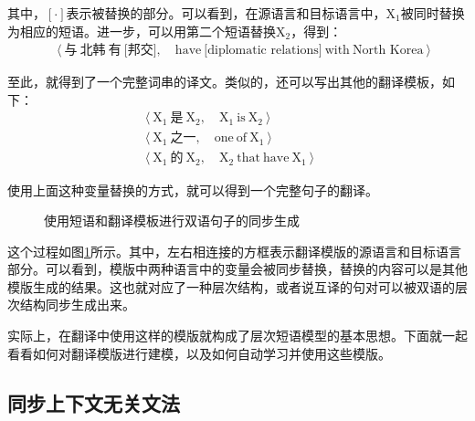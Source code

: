 \noindent 其中，$[\cdot]$表示被替换的部分。可以看到，在源语言和目标语言中，$\textrm{X}_1$被同时替换为相应的短语。进一步，可以用第二个短语替换$\textrm{X}_2$，得到：
\begin{eqnarray}
\quad\langle \ \text{与}\ \text{北韩}\ \text{有}\ \text{[邦交]},\quad \textrm{have}\ \textrm{[diplomatic relations]}\ \textrm{with}\ \textrm{North Korea} \ \rangle \nonumber
\end{eqnarray}

\parinterval 至此，就得到了一个完整词串的译文。类似的，还可以写出其他的翻译模板，如下：
\begin{eqnarray}
\langle \ \textrm{X}_1\ \text{是}\ \textrm{X}_2,\quad \textrm{X}_1\ \textrm{is}\ \textrm{X}_2 \ \rangle \qquad\qquad\ \nonumber \\
\langle \ \textrm{X}_1\ \text{之一},\quad \textrm{one}\ \textrm{of}\ \textrm{X}_1 \ \rangle \qquad\qquad\ \nonumber \\
\langle \ \textrm{X}_1\ \text{的}\ \textrm{X}_2,\quad \textrm{X}_2\ \textrm{that}\ \textrm{have}\ \textrm{X}_1\ \rangle\quad\ \nonumber
\end{eqnarray}

\parinterval 使用上面这种变量替换的方式，就可以得到一个完整句子的翻译。

\begin{figure}[htp]
\centering

\caption{使用短语和翻译模板进行双语句子的同步生成}
\label{fig:4-32}
\end{figure}

\parinterval 这个过程如图\ref{fig:4-32}所示。其中，左右相连接的方框表示翻译模版的源语言和目标语言部分。可以看到，模版中两种语言中的变量会被同步替换，替换的内容可以是其他模版生成的结果。这也就对应了一种层次结构，或者说互译的句对可以被双语的层次结构同步生成出来。

\parinterval 实际上，在翻译中使用这样的模版就构成了层次短语模型的基本思想。下面就一起看看如何对翻译模版进行建模，以及如何自动学习并使用这些模版。


\subsection{同步上下文无关文法}

